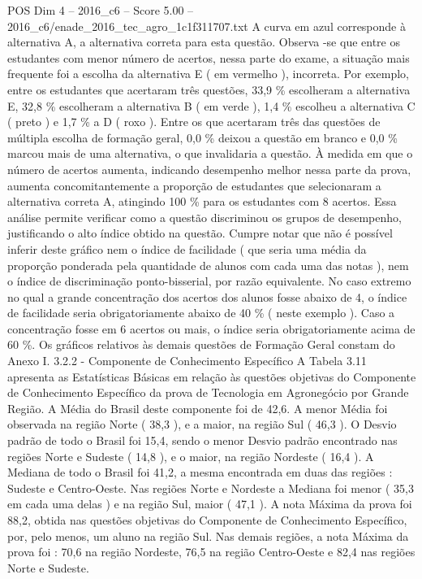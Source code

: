 \begin{textsample}{POS Dim 4 – 2016\_c6 – Score 5.00 – 2016\_c6/enade\_2016\_tec\_agro\_1c1f311707.txt}
A curva em azul corresponde à alternativa A, a alternativa correta para esta questão.
Observa -se que entre os estudantes com menor número de acertos, nessa parte do exame, a situação mais frequente foi a escolha da alternativa E ( em vermelho ), incorreta.
Por exemplo, entre os estudantes que acertaram três questões, 33,9 \% escolheram a alternativa E, 32,8 \% escolheram a alternativa B ( em verde ), 1,4 \% escolheu a alternativa C ( preto ) e 1,7 \% a D ( roxo ).
Entre os que acertaram três das questões de múltipla escolha de formação geral, 0,0 \% deixou a questão em branco e 0,0 \% marcou mais de uma alternativa, o que invalidaria a questão.
À medida em que o número de acertos aumenta, indicando desempenho melhor nessa parte da prova, aumenta concomitantemente a proporção de estudantes que selecionaram a alternativa correta A, atingindo 100 \% para os estudantes com 8 acertos.
Essa análise permite verificar como a questão discriminou os grupos de desempenho, justificando o alto índice obtido na questão.
Cumpre notar que não é possível inferir deste gráfico nem o índice de facilidade ( que seria uma média da proporção ponderada pela quantidade de alunos com cada uma das notas ), nem o índice de discriminação ponto-bisserial, por razão equivalente.
No caso extremo no qual a grande concentração dos acertos dos alunos fosse abaixo de 4, o índice de facilidade seria obrigatoriamente abaixo de 40 \% ( neste exemplo ).
Caso a concentração fosse em 6 acertos ou mais, o índice seria obrigatoriamente acima de 60 \%.
Os gráficos relativos às demais questões de Formação Geral constam do Anexo I. 3.2.2 - Componente de Conhecimento Específico A Tabela 3.11 apresenta as Estatísticas Básicas em relação às questões objetivas do Componente de Conhecimento Específico da prova de Tecnologia em Agronegócio por Grande Região.
A Média do Brasil deste componente foi de 42,6.
A menor Média foi observada na região Norte ( 38,3 ), e a maior, na região Sul ( 46,3 ).
O Desvio padrão de todo o Brasil foi 15,4, sendo o menor Desvio padrão encontrado nas regiões Norte e Sudeste ( 14,8 ), e o maior, na região Nordeste ( 16,4 ).
A Mediana de todo o Brasil foi 41,2, a mesma encontrada em duas das regiões : Sudeste e Centro-Oeste.
Nas regiões Norte e Nordeste a Mediana foi menor ( 35,3 em cada uma delas ) e na região Sul, maior ( 47,1 ).
A nota Máxima da prova foi 88,2, obtida nas questões objetivas do Componente de Conhecimento Específico, por, pelo menos, um aluno na região Sul.
Nas demais regiões, a nota Máxima da prova foi : 70,6 na região Nordeste, 76,5 na região Centro-Oeste e 82,4 nas regiões Norte e Sudeste.

\end{textsample}
